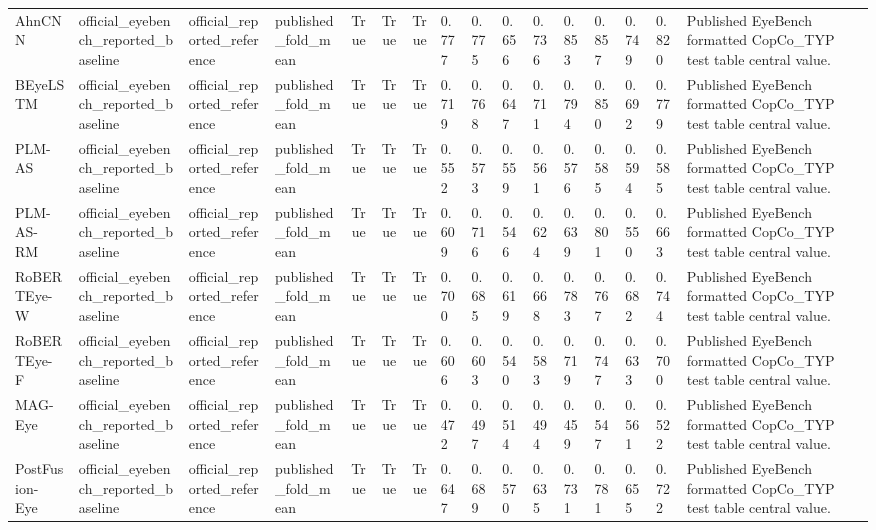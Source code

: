 \begin{tabular}{llllrrrlllllllll}
AhnCNN~\citep{ahn2020towards} & official_eyebench_reported_baseline & official_reported_reference & published_fold_mean & True & True & True & 0.777 & 0.775 & 0.656 & 0.736 & 0.853 & 0.857 & 0.749 & 0.820 & Published EyeBench formatted CopCo_TYP test table central value. \\
BEyeLSTM~\citep{reich_inferring_2022} & official_eyebench_reported_baseline & official_reported_reference & published_fold_mean & True & True & True & 0.719 & 0.768 & 0.647 & 0.711 & 0.794 & 0.850 & 0.692 & 0.779 & Published EyeBench formatted CopCo_TYP test table central value. \\
PLM-AS~\citep{Yang2023PLMASPL} & official_eyebench_reported_baseline & official_reported_reference & published_fold_mean & True & True & True & 0.552 & 0.573 & 0.559 & 0.561 & 0.576 & 0.585 & 0.594 & 0.585 & Published EyeBench formatted CopCo_TYP test table central value. \\
PLM-AS-RM~\citep{haller2022eye} & official_eyebench_reported_baseline & official_reported_reference & published_fold_mean & True & True & True & 0.609 & 0.716 & 0.546 & 0.624 & 0.639 & 0.801 & 0.550 & 0.663 & Published EyeBench formatted CopCo_TYP test table central value. \\
RoBERTEye-W~\citep{Shubi2024Finegrained} & official_eyebench_reported_baseline & official_reported_reference & published_fold_mean & True & True & True & 0.700 & 0.685 & 0.619 & 0.668 & 0.783 & 0.767 & 0.682 & 0.744 & Published EyeBench formatted CopCo_TYP test table central value. \\
RoBERTEye-F~\citep{Shubi2024Finegrained} & official_eyebench_reported_baseline & official_reported_reference & published_fold_mean & True & True & True & 0.606 & 0.603 & 0.540 & 0.583 & 0.719 & 0.747 & 0.633 & 0.700 & Published EyeBench formatted CopCo_TYP test table central value. \\
MAG-Eye~\citep{Shubi2024Finegrained} & official_eyebench_reported_baseline & official_reported_reference & published_fold_mean & True & True & True & 0.472 & 0.497 & 0.514 & 0.494 & 0.459 & 0.547 & 0.561 & 0.522 & Published EyeBench formatted CopCo_TYP test table central value. \\
PostFusion-Eye~\citep{Shubi2024Finegrained} & official_eyebench_reported_baseline & official_reported_reference & published_fold_mean & True & True & True & 0.647 & 0.689 & 0.570 & 0.635 & 0.731 & 0.781 & 0.655 & 0.722 & Published EyeBench formatted CopCo_TYP test table central value. \\
\bottomrule
\end{tabular}
